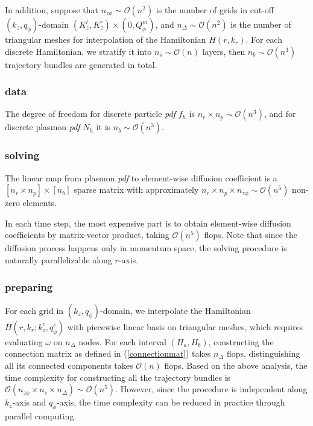 \documentclass{article}
\numberwithin{equation}{section}
\begin{document}
In addition, suppose that $n_{z\phi}\sim \mathcal{O}(n^{2})$ is the number of grids in cut-off $(k_{z}, q_{\phi})$-domain $(K^{l}_{z}, K^{r}_{z})\times (0, Q^{m}_{\phi})$, and $n_{\Delta}\sim \mathcal{O}(n^{2})$ is the number of triangular meshes for interpolation of the Hamiltonian $H(r,k_{r})$. For each discrete Hamiltonian, we stratify it into $n_{s} \sim \mathcal{O}(n)$ layers, then $n_{b} \sim \mathcal{O}(n^{3})$ trajectory bundles are generated in total.

\subsubsection*{data}
The degree of freedom for discrete particle \textit{pdf} $f_{h}$ is $n_{r}\times n_{p} \sim \mathcal{O}(n^{3})$, and for discrete plasmon \textit{pdf} $N_{h}$ it is $n_{b} \sim \mathcal{O}(n^{3})$.



\subsubsection*{solving}
The linear map from plasmon \textit{pdf} to element-wise diffusion coefficient is a $\left[n_{r}\times n_{p}\right] \times \left[n_{b} \right]$ sparse matrix with approximately $n_{r}\times n_{p} \times n_{z\phi}\sim \mathcal{O}(n^{5})$ non-zero elements. 

In each time step, the most expensive part is to obtain element-wise diffusion coefficients by matrix-vector product, taking $\mathcal{O}(n^{5})$ flops. Note that since the diffusion process happens only in momentum space, the solving procedure is naturally parallelizable along $r$-axis.

\subsubsection*{preparing}

For each grid in $(k_{z}, q_{\phi})$-domain, we interpolate the Hamiltonian $H(r,k_{r};k^{c}_{z}, q^{c}_{\phi})$ with piecewise linear basis on triangular meshes, which requires evaluating $\omega$ on $n_{\Delta}$ nodes. For each interval $(H_{a}, H_{b})$, constructing the connection matrix as defined in (\ref{connectionmat}) takes $n_{\Delta}$ flops, distinguishing all its connected components takes $\mathcal{O}(n)$ flops. Based on the above analysis, the time complexity for constructing all the trajectory bundles is $\mathcal{O}(n_{z\phi} \times n_{s} \times n_{\Delta}) \sim \mathcal{O}(n^{5})$. However, since the procedure is independent along $k_{z}$-axis and $q_{\phi}$-axis, the time complexity can be reduced in practice through parallel computing. 
\end{document}
